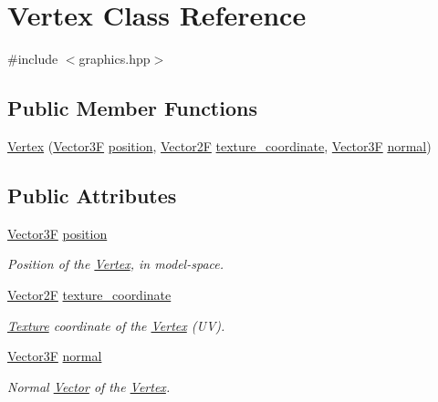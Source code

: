 \hypertarget{class_vertex}{}\section{Vertex Class Reference}
\label{class_vertex}


{\ttfamily \#include $<$graphics.\+hpp$>$}

\subsection*{Public Member Functions}
\begin{DoxyCompactItemize}
\item 
\mbox{\hyperlink{class_vertex_ae4559785564472d10e8d1841d2eb7623}{Vertex}} (\mbox{\hyperlink{class_vector3}{Vector3F}} \mbox{\hyperlink{class_vertex_aa4ab18178c5139414ff693b2b7b9b9e2}{position}}, \mbox{\hyperlink{class_vector2}{Vector2F}} \mbox{\hyperlink{class_vertex_af45cec25c3780af10c8675c931ae29fa}{texture\+\_\+coordinate}}, \mbox{\hyperlink{class_vector3}{Vector3F}} \mbox{\hyperlink{class_vertex_a3bf768cdf45ec52969a5cae3966681d5}{normal}})
\end{DoxyCompactItemize}
\subsection*{Public Attributes}
\begin{DoxyCompactItemize}
\item 
\mbox{\label{class_vertex_aa4ab18178c5139414ff693b2b7b9b9e2}} 
\mbox{\hyperlink{class_vector3}{Vector3F}} \mbox{\hyperlink{class_vertex_aa4ab18178c5139414ff693b2b7b9b9e2}{position}}
\begin{DoxyCompactList}\small\item\em Position of the \mbox{\hyperlink{class_vertex}{Vertex}}, in model-\/space. \end{DoxyCompactList}\item 
\mbox{\label{class_vertex_af45cec25c3780af10c8675c931ae29fa}} 
\mbox{\hyperlink{class_vector2}{Vector2F}} \mbox{\hyperlink{class_vertex_af45cec25c3780af10c8675c931ae29fa}{texture\+\_\+coordinate}}
\begin{DoxyCompactList}\small\item\em \mbox{\hyperlink{class_texture}{Texture}} coordinate of the \mbox{\hyperlink{class_vertex}{Vertex}} (UV). \end{DoxyCompactList}\item 
\mbox{\label{class_vertex_a3bf768cdf45ec52969a5cae3966681d5}} 
\mbox{\hyperlink{class_vector3}{Vector3F}} \mbox{\hyperlink{class_vertex_a3bf768cdf45ec52969a5cae3966681d5}{normal}}
\begin{DoxyCompactList}\small\item\em Normal \mbox{\hyperlink{class_vector}{Vector}} of the \mbox{\hyperlink{class_vertex}{Vertex}}. \end{DoxyCompactList}\end{DoxyCompactItemize}


